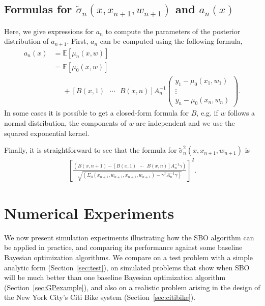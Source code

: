 \documentclass{article}
\newcommand{\w}{w}
\newcommand{\sigmatilde}{\tilde{\sigma}}
\begin{document}
\subsection{Formulas for $\sigmatilde_{n}\left(x,x_{n+1},\w_{n+1}\right)$
and $a_{n}\left(x\right)$ }

Here, we give expressions for $a_n$  to compute the parameters of the posterior distribution of $a_{n+1}$. First,
$a_{n}$ can be computed using the following formula,
\begin{align*}
a_{n}\left(x\right) &= \mathbb{E}\left[\mu_{n}\left(x,\w\right)\right]\\
 &= \mathbb{E}\left[\mu_{0}\left(x,\w\right)\right]\\
 &\phantom{{}=}+\left[B\left(x,1\right)\mbox{ }\cdots\mbox{ }B\left(x,n\right)\right]A_{n}^{-1}\left(\begin{array}{c}
y_{1}-\mu_{0}\left(x_{1},\w_{1}\right)\\
\vdots\\
y_{n}-\mu_{0}\left(x_{n},\w_{n}\right)
\end{array}\right).
\end{align*}
In some cases it is possible to get a closed-form formula for $B$, e.g. if $\w$ follows a normal distribution, the components of $\w$ are independent and we use the squared exponential kernel.

Finally,  it is straightforward to see that the formula for $\sigmatilde^2_{n}\left(x,x_{n+1},\w_{n+1}\right)$ is
\begin{align*}
\left[\frac{\left(B\left(x,n+1\right)-\left[B\left(x,1\right)\mbox{ }\cdots\mbox{ }B\left(x,n\right)\right]A_{n}^{-1}\gamma\right)}{\sqrt{\left(\Sigma_{0}\left(x_{n+1},\w_{n+1},x_{n+1},\w_{n+1}\right)-\gamma^{T}A_{n}^{-1}\gamma\right)}}\right]^{2}.
\end{align*}

\section{Numerical Experiments}
\label{experiments}

We now present simulation experiments illustrating how the SBO algorithm can be applied in practice, and comparing its performance against some baseline Bayesian optimization algorithms.  We compare on a test problem with a simple analytic form (Section~\ref{sec:test}), on simulated problems that show when SBO will be much better than one baseline Bayesian optimization algorithm (Section~\ref{sec:GPexample}), and also on a realistic problem arising in the design of the New York City's Citi Bike system (Section~\ref{sec:citibike}).
\end{document}
